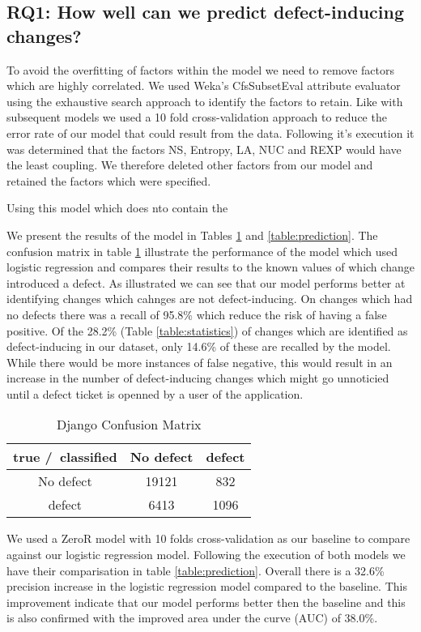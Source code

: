 \documentclass[10pt, conference]{IEEEtran}
\begin{document}
\subsection{RQ1: How well can we predict defect-inducing changes?}
\label{sec:rq1}


To avoid the overfitting of factors within the model we need to remove factors which are highly correlated. We used Weka's CfsSubsetEval attribute evaluator using the exhaustive search approach to identify the factors to retain. Like with subsequent models we used a 10 fold cross-validation approach to reduce the error rate of our model that could result from the data. Following it's execution it was determined that the factors NS, Entropy, LA, NUC and REXP would have the least coupling. We therefore deleted other factors from our model and retained the factors which were specified.



Using this model which does nto contain the 

We present the results of the model in Tables \ref{table:confusion} and \ref{table:prediction}. The confusion matrix in table \ref{table:confusion} illustrate the performance of the model which used logistic regression and compares their results to the known values of which change introduced a defect. As illustrated we can see that our model performs better at identifying changes which cahnges are not defect-inducing. On changes which had no defects there was a recall of 95.8\% which reduce the risk of having a false positive. Of the 28.2\% (Table \ref{table:statistics}) of changes which are identified as defect-inducing in our dataset, only 14.6\% of these are recalled by the model. While there would be more instances of false negative, this would result in an increase in the number of defect-inducing changes which might go unnoticied until a defect ticket is openned by a user of the application.  
\begin{table}[b]
	\centering
	\caption{Django Confusion Matrix}
	\begin{tabular}{|c|c|c|}
		\hline 
		true /\ classified  & No defect  & defect \tabularnewline
		\hline 
		No defect  & 19121  & 832 \tabularnewline
		\hline 
		defect  & 6413  & 1096 \tabularnewline
		\hline 
	\end{tabular}
	\label{table:confusion}
\end{table}

We used a ZeroR model with 10 folds cross-validation as our baseline to compare against our logistic regression model. Following the execution of both models we have their comparisation in table \ref{table:prediction}. Overall there is a 32.6\% precision increase in the logistic regression model compared to the baseline. This improvement indicate that our model performs better then the baseline and this is also confirmed with the improved area under the curve (AUC) of 38.0\%.   
\end{document}
